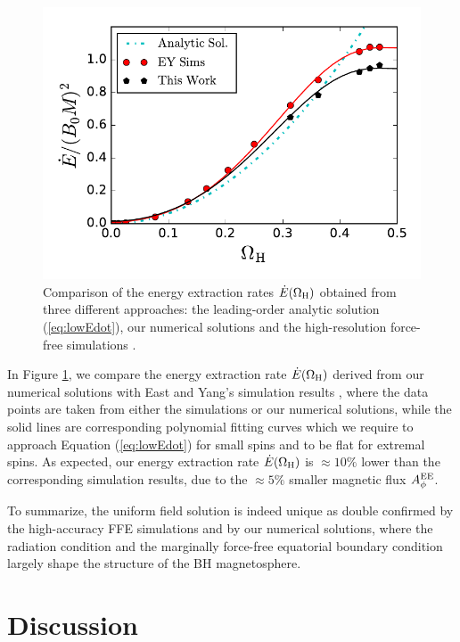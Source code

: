 \documentclass[aps,prd,reprint,nofootinbib, superscriptaddress]{revtex4-1}
\def\WH{\Omega_{\rm H}}
\def\AEE{A_\phi^{\rm EE}}
\begin{document}
\begin{figure}
\includegraphics[scale=0.7]{f3}
\caption{\label{fig:Edot} Comparison of the energy extraction rates $\dot E(\WH)$ obtained from
three different approaches: the leading-order analytic solution (\ref{eq:lowEdot}),
our numerical solutions and  the high-resolution force-free simulations \cite{East2018}.}
\end{figure}

In Figure \ref{fig:Edot}, we compare the energy extraction rate $\dot E(\WH)$
derived from our numerical solutions with East and Yang's simulation results
\cite{East2018}, where the data points are taken from either the simulations
or our numerical solutions, while the solid lines are corresponding polynomial
fitting curves which we require to approach Equation (\ref{eq:lowEdot}) for small
spins and to be flat for extremal spins. As expected, our energy extraction
rate $\dot E(\WH)$ is $\approx 10\%$ lower than the corresponding simulation results,
due to the $\approx 5\%$ smaller magnetic flux $\AEE$.

To summarize, the uniform field solution is indeed unique as double confirmed by the high-accuracy FFE
simulations and by our numerical solutions, where the radiation condition and the marginally force-free
equatorial boundary condition largely shape the  structure of the BH magnetosphere.

\section{Discussion}
\label{sec:discussion}
\end{document}

